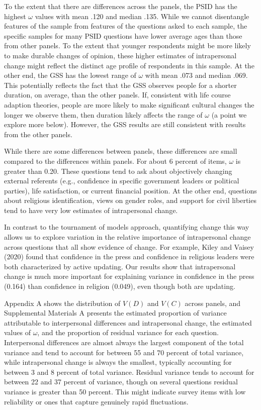 \documentclass[
  11pt,
]{article}
\begin{document}
To the extent that there are differences across the panels, the PSID has
the highest \(\omega\) values with mean .120 and median .135. While we
cannot disentangle features of the sample from features of the questions
asked to each sample, the specific samples for many PSID questions have
lower average ages than those from other panels. To the extent that
younger respondents might be more likely to make durable changes of
opinion, these higher estimates of intrapersonal change might reflect
the distinct age profile of respondents in this sample. At the other
end, the GSS has the lowest range of \(\omega\) with mean .073 and
median .069. This potentially reflects the fact that the GSS observes
people for a shorter duration, on average, than the other panels. If,
consistent with life course adaption theories, people are more likely to
make significant cultural changes the longer we observe them, then
duration likely affects the range of \(\omega\) (a point we explore more
below). However, the GSS results are still consistent with results from
the other panels.

While there are some differences between panels, these differences are
small compared to the differences within panels. For about 6 percent of
items, \(\omega\) is greater than 0.20. These questions tend to ask
about objectively changing external referents (e.g., confidence in
specific government leaders or political parties), life satisfaction, or
current financial position. At the other end, questions about religious
identification, views on gender roles, and support for civil liberties
tend to have very low estimates of intrapersonal change.

In contrast to the tournament of models approach, quantifying change
this way allows us to explore variation in the relative importance of
intrapersonal change across questions that all show evidence of change.
For example, Kiley and Vaisey (2020) found that confidence in the press
and confidence in religious leaders were both characterized by active
updating. Our results show that intrapersonal change is much more
important for explaining variance in confidence in the press (0.164)
than confidence in religion (0.049), even though both are updating.

Appendix A shows the distribution of \(V(D)\) and \(V(C)\) across
panels, and Supplemental Materials A presents the estimated proportion
of variance attributable to interpersonal differences and intrapersonal
change, the estimated values of \(\omega\), and the proportion of
residual variance for each question. Interpersonal differences are
almost always the largest component of the total variance and tend to
account for between 55 and 70 percent of total variance, while
intrapersonal change is always the smallest, typically accounting for
between 3 and 8 percent of total variance. Residual variance tends to
account for between 22 and 37 percent of variance, though on several
questions residual variance is greater than 50 percent. This might
indicate survey items with low reliability or ones that capture
genuinely rapid fluctuations.
\end{document}

